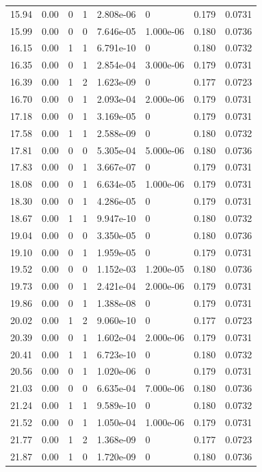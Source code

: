 \documentclass[preview]{standalone}
\begin{document}
{{{\begin{tabular}{L{1.2cm}C{1.2cm} C{0.3cm}C{0.5cm} C{1.4cm}C{1.4cm} C{1.4cm}C{1.4cm}}
  15.94  &  0.00  & 0     &  1 &  2.808e-06  & 0  & 0.179 &  0.0731   \\ 
  15.99  &  0.00  & 0     &  0 &  7.646e-05  & 1.000e-06  & 0.180 &  0.0736   \\ 
  16.15  &  0.00  & 1     &  1 &  6.791e-10  & 0  & 0.180 &  0.0732   \\ 
  16.35  &  0.00  & 0     &  1 &  2.854e-04  & 3.000e-06  & 0.179 &  0.0731   \\ 
  16.39  &  0.00  & 1     &  2 &  1.623e-09  & 0  & 0.177 &  0.0723   \\ 
  16.70  &  0.00  & 0     &  1 &  2.093e-04  & 2.000e-06  & 0.179 &  0.0731   \\ 
  17.18  &  0.00  & 0     &  1 &  3.169e-05  & 0  & 0.179 &  0.0731   \\ 
  17.58  &  0.00  & 1     &  1 &  2.588e-09  & 0  & 0.180 &  0.0732   \\ 
  17.81  &  0.00  & 0     &  0 &  5.305e-04  & 5.000e-06  & 0.180 &  0.0736   \\ 
  17.83  &  0.00  & 0     &  1 &  3.667e-07  & 0  & 0.179 &  0.0731   \\ 
  18.08  &  0.00  & 0     &  1 &  6.634e-05  & 1.000e-06  & 0.179 &  0.0731   \\ 
  18.30  &  0.00  & 0     &  1 &  4.286e-05  & 0  & 0.179 &  0.0731   \\ 
  18.67  &  0.00  & 1     &  1 &  9.947e-10  & 0  & 0.180 &  0.0732   \\ 
  19.04  &  0.00  & 0     &  0 &  3.350e-05  & 0  & 0.180 &  0.0736   \\ 
  19.10  &  0.00  & 0     &  1 &  1.959e-05  & 0  & 0.179 &  0.0731   \\ 
  19.52  &  0.00  & 0     &  0 &  1.152e-03  & 1.200e-05  & 0.180 &  0.0736   \\ 
  19.73  &  0.00  & 0     &  1 &  2.421e-04  & 2.000e-06  & 0.179 &  0.0731   \\ 
  19.86  &  0.00  & 0     &  1 &  1.388e-08  & 0  & 0.179 &  0.0731   \\ 
  20.02  &  0.00  & 1     &  2 &  9.060e-10  & 0  & 0.177 &  0.0723   \\ 
  20.39  &  0.00  & 0     &  1 &  1.602e-04  & 2.000e-06  & 0.179 &  0.0731   \\ 
  20.41  &  0.00  & 1     &  1 &  6.723e-10  & 0  & 0.180 &  0.0732   \\ 
  20.56  &  0.00  & 0     &  1 &  1.020e-06  & 0  & 0.179 &  0.0731   \\ 
  21.03  &  0.00  & 0     &  0 &  6.635e-04  & 7.000e-06  & 0.180 &  0.0736   \\ 
  21.24  &  0.00  & 1     &  1 &  9.589e-10  & 0  & 0.180 &  0.0732   \\ 
  21.52  &  0.00  & 0     &  1 &  1.050e-04  & 1.000e-06  & 0.179 &  0.0731   \\ 
  21.77  &  0.00  & 1     &  2 &  1.368e-09  & 0  & 0.177 &  0.0723   \\ 
  21.87  &  0.00  & 1     &  0 &  1.720e-09  & 0  & 0.180 &  0.0736   \\ 
\hline 
\end{tabular} 

}}}
\end{document}
